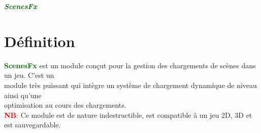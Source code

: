 \documentclass[a4paper, 11pt]{article}
\begin{document}
	\pagecolor{silver}
	\huge{\hspace{15.5cm}\textit{\textbf{\textcolor{darkgreen}{ScenesFx}}}}\large{} \tableofcontents
	\newpage
	\section{Définition}
	\textcolor{darkgreen}{\textbf{ScenesFx}} est un module conçut pour la gestion des chargements de scènes 
	dans un jeu. C'est un \\module très puissant qui intègre un système de chargement dynamique de niveau 
	ainsi qu'une \\optimisation au cours des chargements.\\
	\textcolor{red}{\textbf{NB}:} Ce module est de nature indestructible, est compatible à un jeu 2D, 3D et 
	est sauvegardable.

\end{document}

